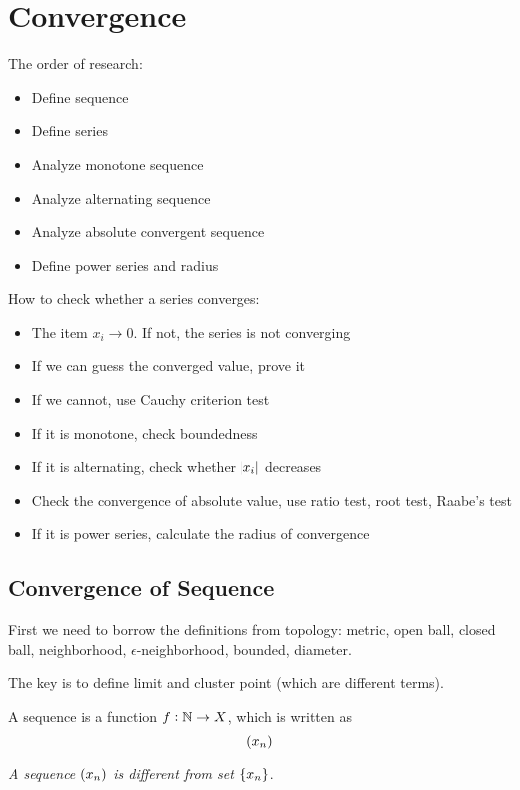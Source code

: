 \chapter{Convergence}

The order of research:
\begin{itemize}
    \item Define sequence    
    \item Define series
    \item Analyze monotone sequence
    \item Analyze alternating sequence
    \item Analyze absolute convergent sequence
    \item Define power series and radius
\end{itemize}


How to check whether a series converges:
\begin{itemize}
    \item The item $x_i \rightarrow 0$. If not, the series is not converging
    \item If we can guess the converged value, prove it
    \item If we cannot, use Cauchy criterion test
    \item If it is monotone, check boundedness
    \item If it is alternating, check whether $\abs{x_i}$ decreases
    \item Check the convergence of absolute value, use ratio test, root test, Raabe's test
    \item If it is power series, calculate the radius of convergence
\end{itemize}

%
%
%
%

\section{Convergence of Sequence}

First we need to borrow the definitions from topology: metric, open ball, closed ball, neighborhood, $\epsilon$-neighborhood, bounded, diameter.

The key is to define limit and cluster point (which are different terms).

\begin{definition}
    A sequence is a function $f: \mathbb{N} \rightarrow X$, which is written as
    \begin{equation}
        \sequence{x_n}
    \end{equation}
    
    \emph{A sequence $\sequence{x_n}$ is different from set $\set{x_n}$}.
\end{definition}

